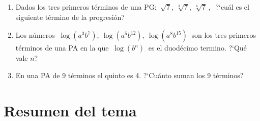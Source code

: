 \begin{enumerate}
\begin{flushright}
\begin{footnotesize} \textcolor{gris}{}	\end{footnotesize}
\end{flushright}

%
\item	Dados los tres primeros términos de una PG: $\ \sqrt{7},\ \sqrt[3]{7},\ \sqrt[6]{7}\, , \ $ ?`cuál es el siguiente término de la progresión?

\vspace{-6mm}
\begin{flushright}
\begin{footnotesize} \textcolor{gris}{}	\end{footnotesize}
\end{flushright}

%
\item	Los números $\ \log(a^3b^7),\ \log(a^5b^{12}),\ \log(a^8b^{15})\ $ son los tres primeros términos de una PA en la que $\ \log(b^n)\ $ es el duodécimo termino. ?`Qué vale $n$?

\vspace{-6mm}
\begin{flushright}
\begin{footnotesize} \textcolor{gris}{}	\end{footnotesize}
\end{flushright}

%
\item	En una PA de 9 términos el quinto es 4. ?`Cuánto suman los 9 términos?

\vspace{-6mm}
\begin{flushright}
\begin{footnotesize} \textcolor{gris}{}	\end{footnotesize}
\end{flushright}


\end{enumerate}



\newpage
\section{Resumen del tema}
\vspace{1cm}

